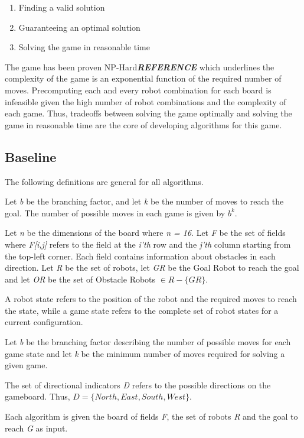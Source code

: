 \documentclass[]{article}
\providecommand{\tightlist}{%
  \setlength{\itemsep}{0pt}\setlength{\parskip}{0pt}}
\begin{document}
\begin{enumerate}
\def\labelenumi{\arabic{enumi}.}
\tightlist
\item
  Finding a valid solution
\item
  Guaranteeing an optimal solution
\item
  Solving the game in reasonable time
\end{enumerate}

The game has been proven NP-Hard\textbf{\emph{REFERENCE}} which
underlines the complexity of the game is an exponential function of the
required number of moves. Precomputing each and every robot combination
for each board is infeasible given the high number of robot combinations
and the complexity of each game. Thus, tradeoffs between solving the
game optimally and solving the game in reasonable time are the core of
developing algorithms for this game.

\subsection{Baseline}\label{baseline}

The following definitions are general for all algorithms.

Let \emph{b} be the branching factor, and let \emph{k} be the number of
moves to reach the goal. The number of possible moves in each game is
given by \(b^k\).

Let \emph{n} be the dimensions of the board where \emph{n = 16}. Let
\emph{F} be the set of fields where \emph{F{[}i,j{]}} refers to the
field at the \emph{i'th} row and the \emph{j'th} column starting from
the top-left corner. Each field contains information about obstacles in
each direction. Let \emph{R} be the set of robots, let \emph{GR} be the
Goal Robot to reach the goal and let \emph{OR} be the set of Obstacle
Robots \(\in R - \{GR\}\).

A robot state refers to the position of the robot and the required moves
to reach the state, while a game state refers to the complete set of
robot states for a current configuration.

Let \emph{b} be the branching factor describing the number of possible
moves for each game state and let \emph{k} be the minimum number of
moves required for solving a given game.

The set of directional indicators \emph{D} refers to the possible
directions on the gameboard. Thus,
\(D = \{ North, East, South, West \}\).

Each algorithm is given the board of fields \emph{F}, the set of robots
\emph{R} and the goal to reach \emph{G} as input.
\end{document}
